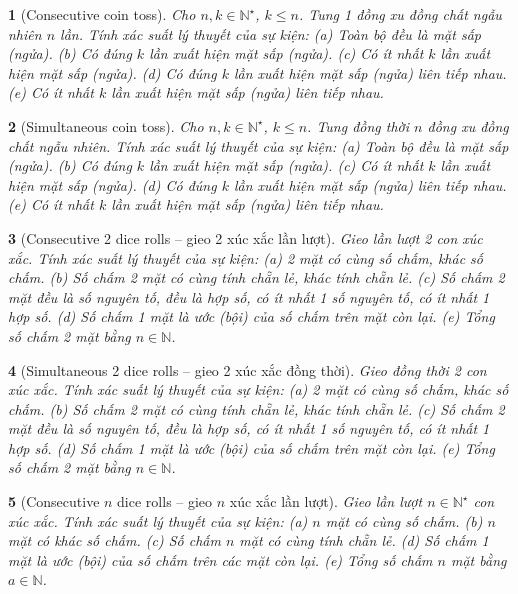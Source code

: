 \documentclass{article}
\newtheorem{baitoan}{}
\begin{document}
\begin{baitoan}[Consecutive coin toss]
	Cho $n,k\in\mathbb{N}^\star$, $k\le n$. Tung 1 đồng xu đồng chất ngẫu nhiên $n$ lần. Tính xác suất lý thuyết của sự kiện: (a) Toàn bộ đều là mặt sấp (ngửa). (b) Có đúng $k$ lần xuất hiện mặt sấp (ngửa). (c) Có ít nhất $k$ lần xuất hiện mặt sấp (ngửa). (d) Có đúng $k$ lần xuất hiện mặt sấp (ngửa) liên tiếp nhau. (e) Có ít nhất $k$ lần xuất hiện mặt sấp (ngửa) liên tiếp nhau.
\end{baitoan}

\begin{baitoan}[Simultaneous coin toss]
	Cho $n,k\in\mathbb{N}^\star$, $k\le n$. Tung đồng thời $n$ đồng xu đồng chất ngẫu nhiên. Tính xác suất lý thuyết của sự kiện: (a) Toàn bộ đều là mặt sấp (ngửa). (b) Có đúng $k$ lần xuất hiện mặt sấp (ngửa). (c) Có ít nhất $k$ lần xuất hiện mặt sấp (ngửa). (d) Có đúng $k$ lần xuất hiện mặt sấp (ngửa) liên tiếp nhau. (e) Có ít nhất $k$ lần xuất hiện mặt sấp (ngửa) liên tiếp nhau.
\end{baitoan}

\begin{baitoan}[Consecutive 2 dice rolls -- gieo 2 xúc xắc lần lượt]
	Gieo lần lượt 2 con xúc xắc. Tính xác suất lý thuyết của sự kiện: (a) 2 mặt có cùng số chấm, khác số chấm. (b) Số chấm 2 mặt có cùng tính chẵn lẻ, khác tính chẵn lẻ. (c) Số chấm 2 mặt đều là số nguyên tố, đều là hợp số, có ít nhất 1 số nguyên tố, có ít nhất 1 hợp số. (d) Số chấm 1 mặt là ước (bội) của số chấm trên mặt còn lại. (e) Tổng số chấm 2 mặt bằng $n\in\mathbb{N}$.
\end{baitoan}

\begin{baitoan}[Simultaneous 2 dice rolls -- gieo 2 xúc xắc đồng thời]
	Gieo đồng thời 2 con xúc xắc. Tính xác suất lý thuyết của sự kiện: (a) 2 mặt có cùng số chấm, khác số chấm. (b) Số chấm 2 mặt có cùng tính chẵn lẻ, khác tính chẵn lẻ. (c) Số chấm 2 mặt đều là số nguyên tố, đều là hợp số, có ít nhất 1 số nguyên tố, có ít nhất 1 hợp số. (d) Số chấm 1 mặt là ước (bội) của số chấm trên mặt còn lại. (e) Tổng số chấm 2 mặt bằng $n\in\mathbb{N}$.
\end{baitoan}

\begin{baitoan}[Consecutive $n$ dice rolls -- gieo $n$ xúc xắc lần lượt]
	Gieo lần lượt $n\in\mathbb{N}^\star$ con xúc xắc. Tính xác suất lý thuyết của sự kiện: (a) $n$ mặt có cùng số chấm. (b) $n$ mặt có khác số chấm. (c) Số chấm $n$ mặt có cùng tính chẵn lẻ. (d) Số chấm 1 mặt là ước (bội) của số chấm trên các mặt còn lại. (e) Tổng số chấm $n$ mặt bằng $a\in\mathbb{N}$.
\end{baitoan}
\end{document}
